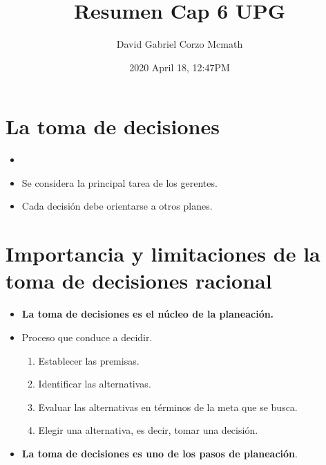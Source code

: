 \documentclass{article}
\title{Resumen Cap 6 UPG}
\date{2020 April 18, 12:47PM}
\author{David Gabriel Corzo Mcmath}
\begin{document}
\maketitle

\section*{La toma de decisiones}
\begin{itemize}
    \item {} 
    \item Se considera la principal tarea de los gerentes. 
    \item Cada decisión debe orientarse a otros planes. 
\end{itemize}

\section{Importancia y limitaciones de la toma de decisiones racional}
\begin{itemize}
    \item \textbf{La toma de decisiones es el núcleo de la planeación.}
    \item Proceso que conduce a decidir.
        \begin{enumerate}
            \item Establecer las premisas.
            \item Identificar las alternativas. 
            \item Evaluar las alternativas en términos de la meta que se busca.
            \item Elegir una alternativa, es decir, tomar una decisión. 
        \end{enumerate}
    
    \item \textbf{La toma de decisiones es uno de los pasos de planeación}.
\end{itemize}



\end{document}

